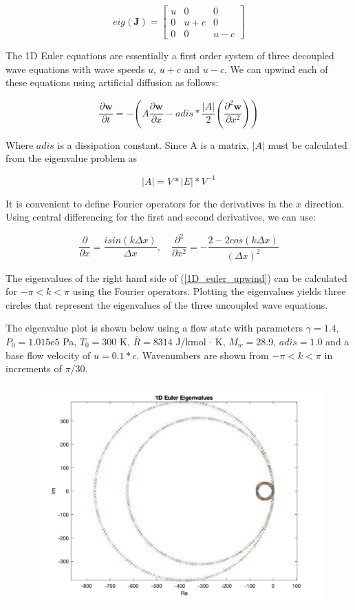 \documentclass[10pt]{article}
\begin{document}
		$$eig(\mathbf{J}) = 
		\begin{bmatrix}
			u & 0 & 0 \\
			0 & u+c & 0 \\
			0 & 0 & u-c
		\end{bmatrix}$$

	The 1D Euler equations are essentially a first order system of three decoupled wave equations with wave speeds $u$, $u+c$ and $u-c$. We can upwind each of these equations using artificial diffusion as follows:
	
	\begin{equation} \label{1D_euler_upwind}
		\frac{\partial \mathbf{w}}{\partial t} = - \left( A \frac{\partial \mathbf{w}}{\partial x} - adis * \frac{|A|}{2} \left( \frac{\partial^2 \mathbf{w}}{\partial x^2} \right) \right)
	\end{equation}

	Where $adis$ is a dissipation constant. Since A is a matrix, $|A|$ must be calculated from the eigenvalue problem as
	
	\begin{equation}
		|A| = V*|E|*V^{-1}
	\end{equation}

	It is convenient to define Fourier operators for the derivatives in the $x$ direction. Using central differencing for the first and second derivatives, we can use:
	
	$$
	\frac{\partial}{\partial x} = \frac{i sin(k \Delta x)}{\Delta x}
	, \quad
	\frac{\partial^2}{\partial x^2} = - \frac{2-2cos(k \Delta x)}{(\Delta x)^2}
	$$
	
	The eigenvalues of the right hand side of (\ref{1D_euler_upwind}) can be calculated for $-\pi < k < \pi$ using the Fourier operators. Plotting the eigenvalues yields three circles that represent the eigenvalues of the three uncoupled wave equations.
	
	The eigenvalue plot is shown below using a flow state with parameters $\gamma = 1.4$, $P_0 = 1.015\mathrm{e}5$ Pa, $T_0 = 300$ K, $\bar{R} = 8314$ J/kmol $\cdot$ K, $M_w = 28.9$, $adis = 1.0$ and a base flow velocity of $u=0.1*c$. Wavenumbers are shown from $-\pi<k<\pi$ in increments of $\pi/30$.
	
	\begin{figure}[h]
		\includegraphics[width=12cm]{1D_euler_eig}
		\centering
	\end{figure}
	
\end{document}
